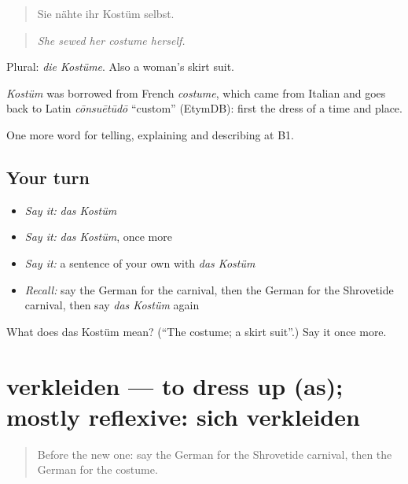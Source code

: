 \begin{quote}
Sie nähte ihr Kostüm selbst.
\end{quote}

\begin{quote}
\emph{She sewed her costume herself.}
\end{quote}

Plural: \emph{die Kostüme}. Also a woman's skirt suit.

\begin{cousinweb}
\emph{Kostüm} was borrowed from French \emph{costume}, which came from Italian and goes back to Latin \emph{cōnsuētūdō} \textquotedblleft{}custom\textquotedblright{} (EtymDB): first the dress of a time and place.
\end{cousinweb}

\begin{grammarlens}[title={What you've built}]
One more word for telling, explaining and describing at B1.
\end{grammarlens}

\subsection*{Your turn}
\begin{itemize}
\raggedright
  \item \emph{Say it:} \emph{das Kostüm}
  \item \emph{Say it:} \emph{das Kostüm}, once more
  \item \emph{Say it:} a sentence of your own with \emph{das Kostüm}
  \item \emph{Recall:} say the German for the carnival, then the German for the Shrovetide carnival, then say \emph{das Kostüm} again
\end{itemize}

\begin{tcolorbox}[breakable,colback=teal!4,colframe=teal!35!black,title={Before you move on}]
What does das Kostüm mean? (\textquotedblleft{}The costume; a skirt suit\textquotedblright{}.) Say it once more.
\end{tcolorbox}
\section[verkleiden]{verkleiden — to dress up (as); mostly reflexive: sich verkleiden}

\label{lesson:GE-C310-verkleiden}



\begin{quote}
Before the new one: say the German for the Shrovetide carnival, then the German for the costume.
\end{quote}

